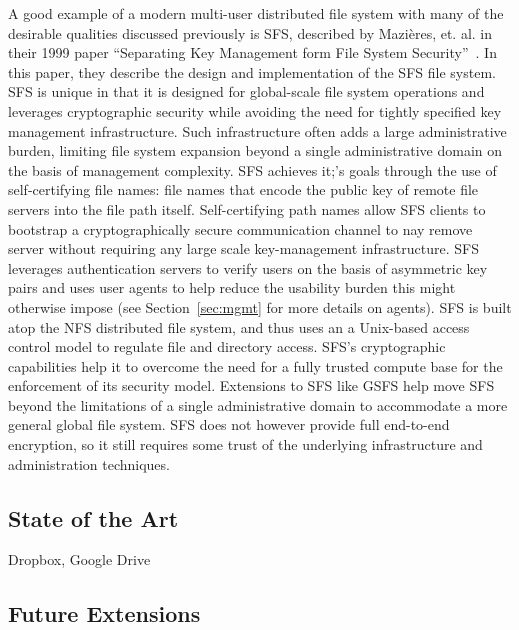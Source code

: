 \documentclass{sig-alternate}
\begin{document}
A good example of a modern multi-user distributed file system with
many of the desirable qualities discussed previously is SFS, described
by Mazi\`{e}res, et. al. in their 1999 paper ``Separating Key
Management form File System Security''~\cite{Mazieres1999}. In this
paper, they describe the design and implementation of the SFS file
system. SFS is unique in that it is designed for global-scale file
system operations and leverages cryptographic security while avoiding
the need for tightly specified key management infrastructure. Such
infrastructure often adds a large administrative burden, limiting file
system expansion beyond a single administrative domain on the basis of
management complexity. SFS achieves it;'s goals through the use of
self-certifying file names: file names that encode the public key of
remote file servers into the file path itself. Self-certifying path
names allow SFS clients to bootstrap a cryptographically secure
communication channel to nay remove server without requiring any large
scale key-management infrastructure. SFS leverages authentication
servers to verify users on the basis of asymmetric key pairs and uses
user agents to help reduce the usability burden this might otherwise
impose (see Section~\ref{sec:mgmt} for more details on agents). SFS is
built atop the NFS distributed file system, and thus uses an a
Unix-based access control model to regulate file and directory
access. SFS's cryptographic capabilities help it to overcome the need
for a fully trusted compute base for the enforcement of its security
model. Extensions to SFS like GSFS help move SFS beyond the
limitations of a single administrative domain to accommodate a more
general global file system. SFS does not however provide full
end-to-end encryption, so it still requires some trust of the
underlying infrastructure and administration techniques.

\subsection{State of the Art}

Dropbox, Google Drive

\subsection{Future Extensions}
\end{document}

